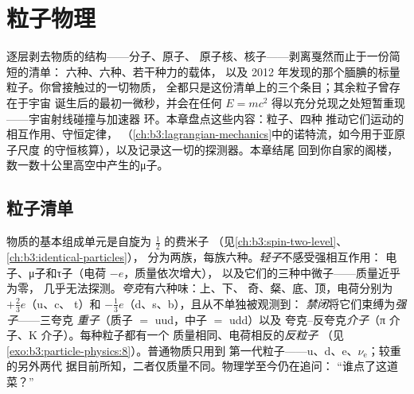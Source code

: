 \chapter{粒子物理}\label{ch:b3:particle-physics}


逐层剥去物质的结构——分子、原子、
原子核、核子——剥离戛然而止于一份简短的清单：
六种\emph{}、六种\emph{}、若干种力的载体，
以及 2012 年发现的那个腼腆的标量粒子。你曾接触过的一切物质，
全都只是这份清单上的三个条目；其余粒子曾存在于宇宙
诞生后的最初一微秒，并会在任何
$E = mc^2$ 得以充分兑现之处短暂重现——宇宙射线碰撞与加速器
环。本章盘点这些内容：粒子、四种
推动它们运动的相互作用、守恒定律，
（\cref{ch:b3:lagrangian-mechanics}中的诺特流，如今用于亚原子尺度
的守恒核算），以及记录这一切的探测器。本章结尾
回到你自家的阁楼，数一数十公里高空中产生的μ子。

\section{粒子清单}

\begin{definition}[轻子、夸克、强子]\label{def:b3:particle-physics:zoo}
物质的基本组成单元是自旋为 $\tfrac12$ 的费米子
（见\cref{ch:b3:spin-two-level}、\cref{ch:b3:identical-particles}），
分为两族，每族六种。\emph{轻子}不感受强相互作用：
电子、μ子和τ子（电荷 $-e$，质量依次增大），
以及它们的三种中微子——质量近乎为零，
几乎无法探测。\emph{夸克}有六种味：上、下、
奇、粲、底、顶，电荷分别为 $+\tfrac23e$（u、c、
t）和 $-\tfrac13e$（d、s、b），且从不单独被观测到：
\emph{禁闭}将它们束缚为\emph{强子}——三夸克
\emph{重子}（质子 $=$ uud，中子 $=$ udd）以及
夸克–反夸克\emph{介子}（π 介子、K 介子）。每种粒子都有一个
质量相同、电荷相反的\emph{反粒子}
（见\cref{exo:b3:particle-physics:8}）。普通物质只用到
第一代粒子——u、d、e、$\nu_{\text{e}}$；较重的另外两代
据目前所知，二者仅质量不同。物理学至今仍在追问：
“谁点了这道菜？”
\end{definition}

